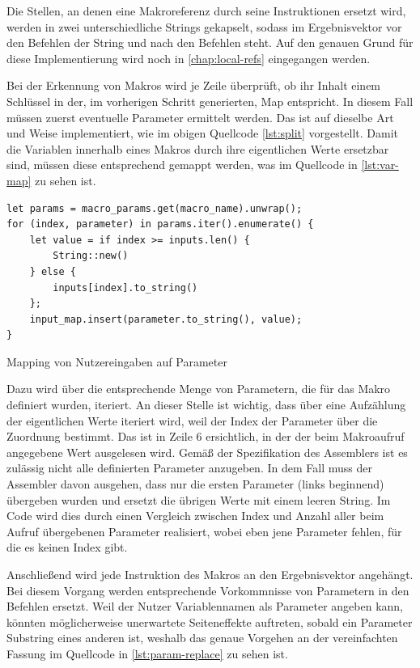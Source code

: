 Die Stellen, an denen eine Makroreferenz durch seine Instruktionen ersetzt wird, werden in zwei unterschiedliche Strings gekapselt, sodass im Ergebnisvektor vor den Befehlen der String  und nach den Befehlen  steht. Auf den genauen Grund für diese Implementierung wird noch in \ref{chap:local-refs} eingegangen werden.

Bei der Erkennung von Makros wird je Zeile überprüft, ob ihr Inhalt einem Schlüssel in der, im vorherigen Schritt generierten, Map entspricht. In diesem Fall müssen zuerst eventuelle Parameter ermittelt werden. Das ist auf dieselbe Art und Weise implementiert, wie im obigen Quellcode \ref{lst:split} vorgestellt. Damit die Variablen innerhalb eines Makros durch ihre eigentlichen Werte ersetzbar sind, müssen diese entsprechend gemappt werden, was im Quellcode in \ref{lst:var-map} zu sehen ist.

\begin{listing}[th]
\begin{verbatim}
let params = macro_params.get(macro_name).unwrap();
for (index, parameter) in params.iter().enumerate() {
	let value = if index >= inputs.len() {
    	String::new()
    } else {
    	inputs[index].to_string()
    };
    input_map.insert(parameter.to_string(), value);
}
\end{verbatim}
\label{lst:var-map}
\caption{Mapping von Nutzereingaben auf Parameter}
\end{listing}

Dazu wird über die entsprechende Menge von Parametern, die für das Makro definiert wurden, iteriert. An dieser Stelle ist wichtig, dass über eine Aufzählung der eigentlichen Werte iteriert wird, weil der Index der Parameter über die Zuordnung bestimmt. Das ist in Zeile 6 ersichtlich, in der der beim Makroaufruf angegebene Wert ausgelesen wird. Gemäß der Spezifikation des Assemblers ist es zulässig nicht alle definierten Parameter anzugeben. In dem Fall muss der Assembler davon ausgehen, dass nur die ersten Parameter (links beginnend) übergeben wurden und ersetzt die übrigen Werte mit einem leeren String. Im Code wird dies durch einen Vergleich zwischen Index und Anzahl aller beim Aufruf übergebenen Parameter realisiert, wobei eben jene Parameter fehlen, für die es keinen Index gibt.

Anschließend wird jede Instruktion des Makros an den Ergebnisvektor angehängt. Bei diesem Vorgang werden entsprechende Vorkommnisse von Parametern in den Befehlen ersetzt. Weil der Nutzer Variablennamen als Parameter angeben kann, könnten möglicherweise unerwartete Seiteneffekte auftreten, sobald ein Parameter Substring eines anderen ist, weshalb das genaue Vorgehen an der vereinfachten Fassung im Quellcode in \ref{lst:param-replace} zu sehen ist.

